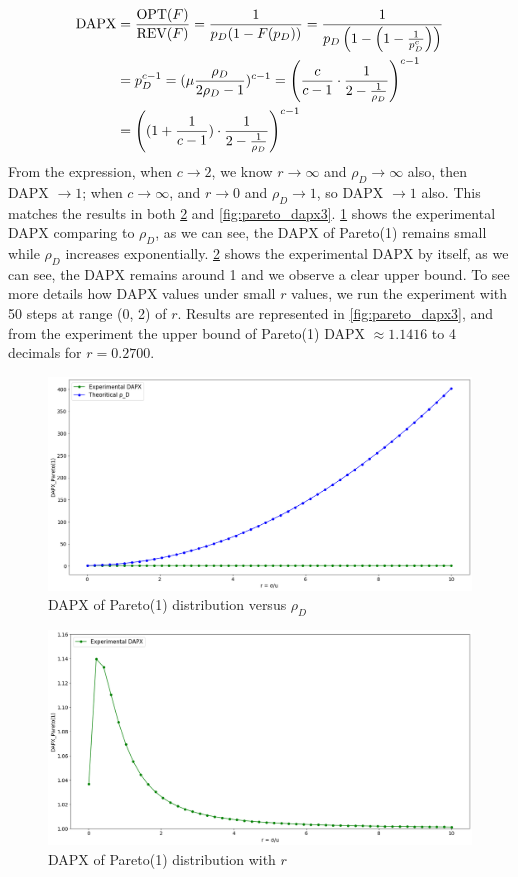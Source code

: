 \begin{equation}\notag
\begin{split}
	\text{DAPX} &= \frac{\text{OPT}(F)}{\text{REV}(F)} =\frac{1}{p_D(1-F(p_D))} =\frac{1}{p_D\left(1-\left(1-\frac{1}{p_D^c}\right)\right)}\\& = p_D^{c-1}	 = (\mu \frac{\rho_{D}}{2\rho_{D}  -1})^{c-1} = \left(\frac{c}{c-1} \cdot \frac{1}{2 - \frac{1}{\rho_{D}}}\right)^{c-1}\\& = \left( (1 + \frac{1}{c-1}) \cdot\frac{1}{2 - \frac{1}{\rho_{D}}}\right)^{c-1}
\end{split}
\end{equation} 
From the expression, when $c \to 2$, we know $r \to \infty$ and $\rho_D  \to \infty$ also, then DAPX $\to 1$; when $c \to \infty$, and $r \to 0$ and $\rho_D  \to 1$, so DAPX $\to 1$ also. This matches the results in both \cref{fig:pareto_dapx2} and \cref{fig:pareto_dapx3}. \cref{fig:pareto_dapx1} shows the experimental DAPX comparing to $\rho_D$, as we can see, the DAPX of Pareto(1) remains small while $\rho_D$ increases exponentially. \cref{fig:pareto_dapx2} shows the experimental DAPX by itself, as we can see, the DAPX remains around 1 and we observe a clear upper bound. To see more details how DAPX values under small $r$ values, we run the experiment with 50 steps at range (0, 2) of $r$. Results are represented in \cref{fig:pareto_dapx3}, and from the experiment the upper bound of Pareto(1) DAPX $\approx 1.1416$ to 4 decimals for $r = 0.2700$.     
\begin{figure}[H]
	\centering
	\includegraphics[width=1\textwidth]{pareto_dapx1}
	\caption{DAPX of Pareto(1) distribution versus $\rho_D$}
	\label{fig:pareto_dapx1}
\end{figure}
\begin{figure}[H]
	\centering
	\includegraphics[width=1\textwidth]{pareto_dapx2}
	\caption{DAPX of Pareto(1) distribution with $r$}
	\label{fig:pareto_dapx2}
\end{figure}
